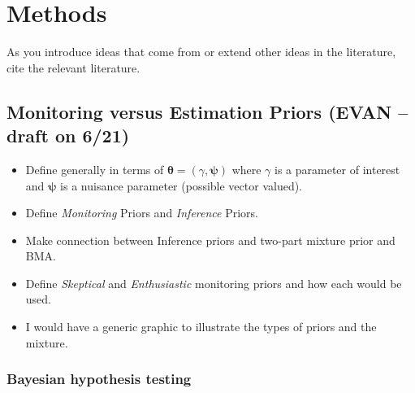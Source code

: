 \documentclass[12pt]{article}
\begin{document}
\section{Methods}

As you introduce ideas that come from or extend other ideas in the literature, cite the relevant literature.

\subsection{Monitoring versus Estimation Priors (EVAN -- draft on 6/21)}

\begin{itemize}
 \item Define generally in terms of $\boldsymbol\theta = \left( \gamma, \boldsymbol\psi  \right)$ where $\gamma$ is a parameter of interest
       and $\boldsymbol\psi$ is a nuisance parameter (possible vector valued).
 \item Define \textit{Monitoring} Priors and \textit{Inference} Priors.
 \item Make connection between Inference priors and two-part mixture prior and BMA.
 \item Define \textit{Skeptical} and \textit{Enthusiastic} monitoring priors and how each would be used.
 \item I would have a generic graphic to illustrate the types of priors and the mixture.
\end{itemize}

\subsubsection{Bayesian hypothesis testing}
\end{document}
